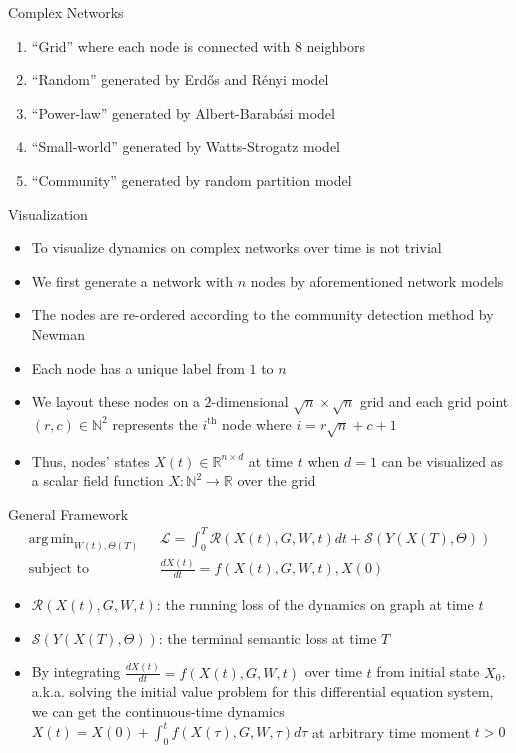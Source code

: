 \documentclass{beamer}
\DeclareMathOperator*{\argmin}{arg\,min}
\begin{document}
\begin{frame}{Complex Networks}
\begin{enumerate}
\item ``Grid'' where each node is connected with 8 neighbors
\item ``Random'' generated by Erd\H{o}s and R\'enyi model
\item ``Power-law'' generated by Albert-Barab\'asi model
\item ``Small-world'' generated by Watts-Strogatz model
\item ``Community'' generated by random partition model
\end{enumerate}
\end{frame}

\begin{frame}{Visualization}
\begin{itemize}
\item To visualize dynamics on complex networks over time is not trivial
\item We first generate a network with $n$ nodes by aforementioned network models
\item The nodes are re-ordered according to the community detection method by Newman
\item Each node has a unique label from $1$ to $n$
\item We layout these nodes on a $2$-dimensional $\sqrt{n}\times\sqrt{n}$ grid and each grid point $(r,c)\in\mathbb{N}^2$ represents the $i^\text{th}$ node where $i=r\sqrt{n}+c+1$
\item Thus, nodes' states $X(t)\in\mathbb{R}^{n\times d}$ at time $t$ when $d=1$ can be visualized as a scalar field function $X:\mathbb{N}^2\to\mathbb{R}$ over the grid
\end{itemize}
\end{frame}

\begin{frame}{General Framework}
\[
\begin{split}
\argmin_{W(t),\Theta(T)}\text{ }&\mathcal{L}=\int_0^T\mathcal{R}\left(X(t),G,W,t\right)dt+\mathcal{S}\left(Y(X(T),\Theta)\right)\\
\text{subject to }&\frac{dX(t)}{dt}=f(X(t),G,W,t),X(0)
\end{split}
\]
\begin{itemize}
\item $\mathcal{R}(X(t),G,W,t)$: the running loss of the dynamics on graph at time $t$
\item $\mathcal{S}(Y(X(T),\Theta))$: the terminal semantic loss at time $T$
\item By integrating $\frac{dX(t)}{dt}=f(X(t),G,W,t)$ over time $t$ from initial state $X_0$, a.k.a. solving the initial value problem for this differential equation system, we can get the continuous-time dynamics $X(t)=X(0)+\int_0^tf(X(\tau),G,W,\tau)d\tau$ at arbitrary time moment $t>0$
\end{itemize}
\end{frame}
\end{document}
